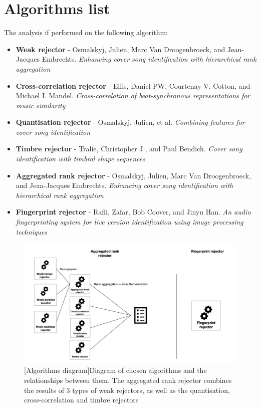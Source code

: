 \section{Algorithms list}
\label{sec:algolist}
The analysis if performed on the following algorithm:
\begin{itemize}
    \item \textbf{Weak rejector} - Osmalskyj, Julien, Marc Van Droogenbroeck,
    and Jean-Jacques Embrechts. \textit{Enhancing cover song identification with
    hierarchical rank aggregation} \cite{osmalsky2016enhancing}
    \item \textbf{Cross-correlation rejector} - Ellis, Daniel PW, Courtenay V.
    Cotton, and Michael I. Mandel. \textit{Cross-correlation of beat-synchronous
    representations for music similarity} \cite{ellis2008cross}
    \item \textbf{Quantisation rejector} - Osmalskyj, Julien, et al.
    \textit{Combining features for cover song identification} \cite{osmalsky2015combining}
    \item \textbf{Timbre rejector} - Tralie, Christopher J., and Paul Bendich.
    \textit{Cover song identification with timbral shape sequences} \cite{tralie2015cover}
    \item \textbf{Aggregated rank rejector} - Osmalskyj, Julien, Marc Van
    Droogenbroeck, and Jean-Jacques Embrechts. \textit{Enhancing cover song
    identification with hierarchical rank aggregation}
    \cite{osmalsky2016enhancing} 
    \item \textbf{Fingerprint rejector} - Rafii, Zafar, Bob Coover, and Jinyu
    Han. \textit{An audio fingerprinting system for live version identification
    using image processing techniques} \cite{rafii2014audio}
\end{itemize}

\begin{figure}[H]
    \centering
    \includegraphics[width=\textwidth]{Algorithms/algorithm_diagram_3.jpg}
    [Algorithms diagram]{Diagram of chosen algorithms and the relationships between them. The aggregated rank rejector combines the results of 3 types of weak rejectors, as well as the quantisation, cross-correlation and timbre rejectors}
    \label{fig:algorithms}
\end{figure}

